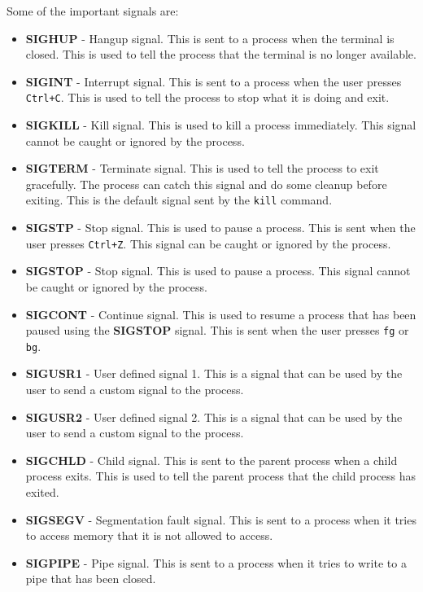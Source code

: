 Some of the important signals are:

\begin{itemize}
  \item \textbf{SIGHUP} - Hangup signal. This is sent to a process when the
  terminal is closed. This is used to tell the process that the terminal
  is no longer available.
\item \textbf{SIGINT} - Interrupt signal. This is sent to a process when the
  user presses \texttt{Ctrl+C}. This is used to tell the process to stop
  what it is doing and exit.
\item \textbf{SIGKILL} - Kill signal. This is used to kill a process immediately.
  This signal cannot be caught or ignored by the process.
\item \textbf{SIGTERM} - Terminate signal. This is used to tell the process
  to exit gracefully. The process can catch this signal and do some cleanup
  before exiting. This is the default signal sent by the \texttt{kill} command.
\item \textbf{SIGSTP} - Stop signal. This is used to pause a process.
  This is sent when the user presses \texttt{Ctrl+Z}. This signal can be
  caught or ignored by the process.
\item \textbf{SIGSTOP} - Stop signal. This is used to pause a process.
  This signal cannot be caught or ignored by the process.
\item \textbf{SIGCONT} - Continue signal. This is used to resume a process
  that has been paused using the \textbf{SIGSTOP} signal. This is sent
  when the user presses \texttt{fg} or \texttt{bg}.
\item \textbf{SIGUSR1} - User defined signal 1. This is a signal that can
  be used by the user to send a custom signal to the process.
\item \textbf{SIGUSR2} - User defined signal 2. This is a signal that can
  be used by the user to send a custom signal to the process.
\item \textbf{SIGCHLD} - Child signal. This is sent to the parent process
  when a child process exits. This is used to tell the parent process that
  the child process has exited.
\item \textbf{SIGSEGV} - Segmentation fault signal. This is sent to a process
  when it tries to access memory that it is not allowed to access.
\item \textbf{SIGPIPE} - Pipe signal. This is sent to a process when it tries
  to write to a pipe that has been closed.
\end{itemize}

